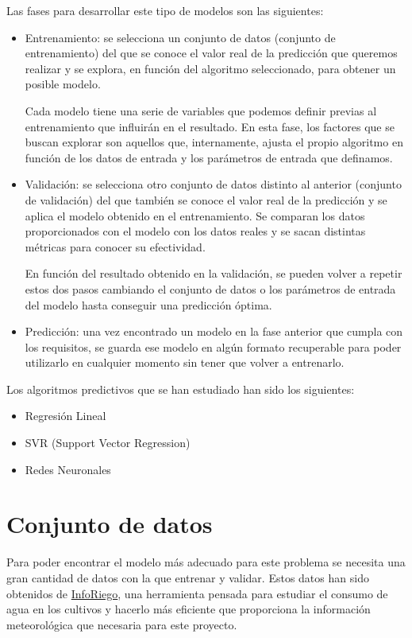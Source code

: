 Las fases para desarrollar este tipo de modelos son las siguientes:
\begin{itemize}
\item Entrenamiento: se selecciona un conjunto de datos (conjunto de entrenamiento) del que se conoce el valor real de la predicción que queremos realizar y se explora, en función del algoritmo seleccionado, para obtener un posible modelo.

Cada modelo tiene una serie de variables que podemos definir previas al entrenamiento que influirán en el resultado. En esta fase, los factores que se buscan explorar son aquellos que, internamente, ajusta el propio algoritmo en función de los datos de entrada y los parámetros de entrada que definamos.

\item Validación: se selecciona otro conjunto de datos distinto al anterior (conjunto de validación) del que también se conoce el valor real de la predicción y se aplica el modelo obtenido en el entrenamiento. Se comparan los datos proporcionados con el modelo con los datos reales y se sacan distintas métricas para conocer su efectividad. 

En función del resultado obtenido en la validación, se pueden volver a repetir estos dos pasos cambiando el conjunto de datos o los parámetros de entrada del modelo hasta conseguir una predicción óptima.

\item Predicción: una vez encontrado un modelo en la fase anterior que cumpla con los requisitos, se guarda ese modelo en algún formato recuperable para poder utilizarlo en cualquier momento sin tener que volver a entrenarlo.
\end{itemize}

Los algoritmos predictivos que se han estudiado han sido los siguientes:

\begin{itemize}
\item Regresión Lineal
\item SVR (Support Vector Regression)
\item Redes Neuronales
\end{itemize}

\section{Conjunto de datos}
\label{makereference4.2}

Para poder encontrar el modelo más adecuado para este problema se necesita una gran cantidad de datos con la que entrenar y validar. Estos datos han sido obtenidos de \href{http://www.inforiego.org/opencms/opencms}{InfoRiego}, una herramienta pensada para estudiar el consumo de agua en los cultivos y hacerlo más eficiente que proporciona la información meteorológica que necesaria para este proyecto.

